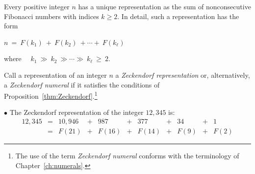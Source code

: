 
\begin{prop}
\label{thm:Zeckendorf}
Every positive integer $n$ has a unique representation as the sum of nonconsecutive Fibonacci numbers with indices $k \geq 2$.  In detail, such a representation has the form

\smallskip

\hspace*{.25in} $n \ = \ F(k_1) \ + \ F(k_2) \ + \cdots + \ F(k_\ell)$

\smallskip

\noindent
where \ \ $k_1 \ \gg \ k_2 \ \gg \cdots \gg \ k_\ell \ \geq \ 2$.
\end{prop}


\bigskip

\noindent {}
\bigskip


\noindent
Call a representation of an integer $n$ a {\it Zeckendorf representation} or, alternatively, a {\it Zeckendorf numeral} if it satisfies the conditions of Proposition~\ref{thm:Zeckendorf}.\footnote{The use of the term {\it Zeckendorf numeral} conforms with the terminology of Chapter~\ref{ch:numerals}.}

\medskip


\noindent $\bullet$
The Zeckendorf representation of the integer $12,345$ is:
\[ \begin{array}{ccccccccccc}
12,345 & =  & 10,946 & + & 987    & +  &   377  & + & 34   & + & 1 \\
            & =  & F(21)  & + & F(16)  & +  & F(14) & + & F(9) & + & F(2)
\end{array} \]     

\medskip

